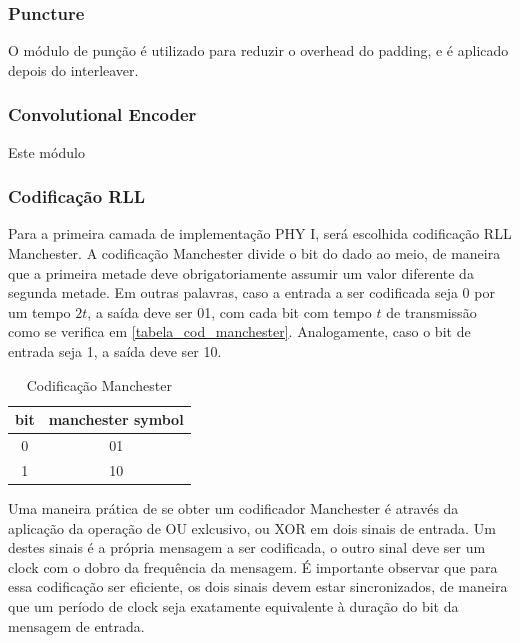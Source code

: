 	\subsubsection{Puncture}
	
	O módulo de punção é utilizado para reduzir o overhead do padding, e é aplicado depois do interleaver.
	
	\subsubsection{Convolutional Encoder}
	
	Este módulo 
	
	\subsubsection{Codificação RLL}
	
	Para a primeira camada de implementação PHY I, será escolhida codificação RLL Manchester. A codificação Manchester divide o bit do dado ao meio, de maneira que a primeira metade deve obrigatoriamente assumir um valor diferente da segunda metade. Em outras palavras, caso a entrada a ser codificada seja 0 por um tempo $2t$, a saída deve ser 01, com cada bit com tempo $t$ de transmissão como se verifica em \autoref{tabela_cod_manchester}. Analogamente, caso o bit de entrada seja 1, a saída deve ser 10.
	
	\begin{table}[ht]
		\caption{Codificação Manchester}
		\centering
		\begin{tabular}{c c}
			\hline
			bit & manchester symbol \\ \hline
			0 & 01 \\
			1 & 10 \\ \hline
		\end{tabular}
		\label{tabela_cod_manchester}
	\end{table}
	
	Uma maneira prática de se obter um codificador Manchester é através da aplicação da operação de OU exlcusivo, ou XOR em dois sinais de entrada. Um destes sinais é a própria mensagem a ser codificada, o outro sinal deve ser um clock com o dobro da frequência da mensagem. É importante observar que para essa codificação ser eficiente, os dois sinais devem estar sincronizados, de maneira que um período de clock seja exatamente equivalente à duração do bit da mensagem de entrada.
	
	
	
